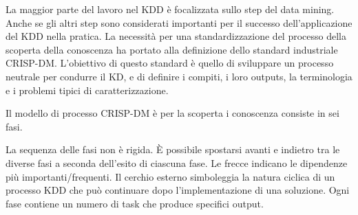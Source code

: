 \documentclass[a4paper]{extarticle}
\begin{document}
La maggior parte del lavoro nel KDD è focalizzata sullo step del data mining. Anche se gli altri step sono considerati importanti per il successo dell'applicazione del KDD nella pratica. La necessità per una standardizzazione del processo della scoperta della conoscenza ha portato alla definizione dello standard industriale CRISP-DM. L'obiettivo di questo standard è quello di sviluppare un processo neutrale per condurre il KD,  e di definire i compiti, i loro outputs, la terminologia e i problemi tipici di caratterizzazione. 

Il modello di processo CRISP-DM è per la scoperta i conoscenza consiste in sei fasi.

\begin{figure}[h]
\noindent
{}%
\end{figure}

La sequenza delle fasi non è rigida. È possibile spostarsi avanti e indietro tra le diverse fasi a seconda dell'esito di ciascuna fase. Le frecce indicano le dipendenze più importanti/frequenti. Il cerchio esterno simboleggia la natura ciclica di un processo KDD che può continuare dopo l'implementazione di una soluzione. Ogni fase contiene un numero di task che produce specifici output.
\end{document}
